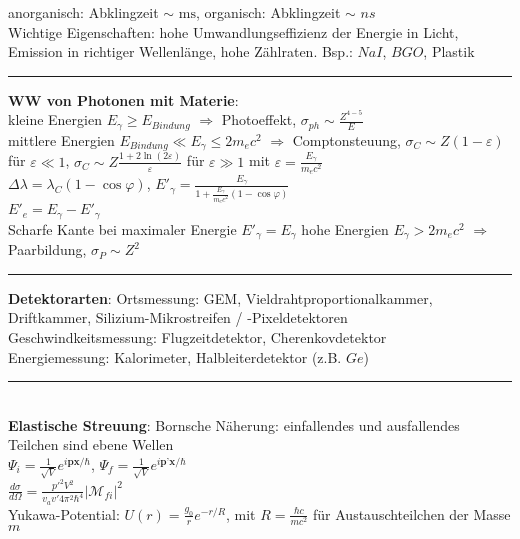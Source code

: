\documentclass[10pt,twoside,a4paper]{article}
\begin{document}
\begin{multicols*}{3}
anorganisch: Abklingzeit $\sim$ $\si{\ms}$, organisch: Abklingzeit $\sim$ $\si{ns}$ \\
Wichtige Eigenschaften: hohe Umwandlungseffizienz der Energie in Licht, Emission in richtiger Wellenlänge, hohe Zählraten. Bsp.: $NaI$, $BGO$, Plastik
\\ \rule[0ex]{\columnwidth}{0.5pt}
\textbf{WW von Photonen mit Materie}: \\ 
kleine Energien $E_{\gamma} \geq E_{Bindung}$ $\Rightarrow$ Photoeffekt, $\sigma_{ph} \sim \frac{Z^{4-5}}{E}$ \\
mittlere Energien $E_{Bindung} \ll E_{\gamma} \leq 2 m_e c^2$ $\Rightarrow$ Comptonsteuung, $\sigma_{C} \sim Z(1 - \varepsilon)$ für $\varepsilon \ll 1$, $\sigma_{C} \sim Z \frac{1 + 2 \ln (2 \varepsilon)}{\varepsilon}$ für $\varepsilon \gg 1$ mit $\varepsilon = \frac{E_{\gamma}}{m_e c^2}$ \\
$\Delta \lambda = \lambda_C \left( 1 - \cos \varphi \right)$, $E'_{\gamma} = \frac{E_{\gamma}}{1 + \frac{E_{\gamma}}{m_e c^2} \left( 1 - \cos \varphi \right)}$ \\
$E'_e = E_{\gamma} - E'_{\gamma}$ \\
Scharfe Kante bei maximaler Energie $E'_{\gamma} = E_{\gamma}$
hohe Energien $E_{\gamma} > 2 m_e c^2$ $\Rightarrow$ Paarbildung, $\sigma_P \sim Z^2$
\\ \rule[0ex]{\columnwidth}{0.5pt}
\textbf{Detektorarten}: Ortsmessung: GEM, Vieldrahtproportionalkammer, Driftkammer, Silizium-Mikrostreifen / -Pixeldetektoren \\
Geschwindkeitsmessung: Flugzeitdetektor, Cherenkovdetektor \\
Energiemessung: Kalorimeter, Halbleiterdetektor (z.B. $Ge$)
\\ \rule[0ex]{\columnwidth}{0.5pt}
\ \\
\textbf{Elastische Streuung}: Bornsche Näherung: einfallendes und ausfallendes Teilchen sind ebene Wellen \\
$\Psi_i = \frac{1}{\sqrt{V}}e^{i\textbf{px} / \hbar}$, $\Psi_f = \frac{1}{\sqrt{V}}e^{i\textbf{p'x} / \hbar}$ \\
$\frac{d\sigma}{d\Omega} = \frac{p'^2 V^2}{v_a v' 4 \pi^2 \hbar^4} \left| \mathcal{M}_{fi} \right|^2$ \\
Yukawa-Potential: $U(r) = \frac{g_0}{r} e^{-r/R}$, mit $R = \frac{\hbar c}{m c^2}$ für Austauschteilchen der Masse $m$ \\

\end{multicols*}
\end{document}

